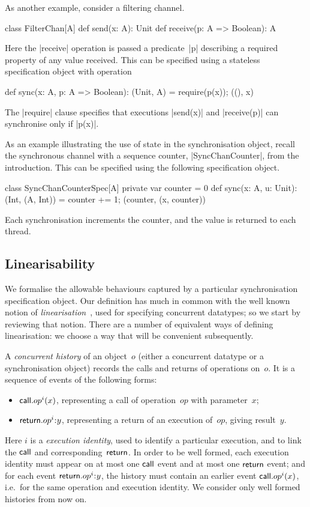 As another example, consider a filtering channel.
\begin{scala}
class FilterChan[A]{
  def send(x: A): Unit
  def receive(p: A => Boolean): A
}
\end{scala}
%
Here the |receive| operation is passed a predicate~|p| describing a required
property of any value received.  This can be specified using a stateless
specification object with operation
%
\begin{scala}
def sync(x: A, p: A => Boolean): (Unit, A) = { require(p(x)); ((), x) }
\end{scala}
%
The |require| clause specifies that executions |send(x)| and |receive(p)| can
synchronise only if |p(x)|.

As an example illustrating the use of state in the synchronisation object,
recall the synchronous channel with a sequence counter, |SyncChanCounter|,
from the introduction.  This can be specified using the following
specification object.
%
\begin{scala}
class SyncChanCounterSpec[A]{
  private var counter = 0
  def sync(x: A, u: Unit): (Int, (A, Int)) = {
    counter += 1; (counter, (x, counter))
  }
}
\end{scala}
%
Each synchronisation increments the counter, and the value is returned to each
thread. 


\subsection{Linearisability}
\label{sec:specification-linearisability}

We formalise the allowable behaviours captured by a particular synchronisation
specification object.  Our definition has much in common with the well known
notion of \emph{linearisation}~\cite{herlihy-wing}, used for specifying
concurrent datatypes; so we start by reviewing that notion.  There are a
number of equivalent ways of defining linearisation: we choose a way that will
be convenient subsequently.

A \emph{concurrent history} of an object~$o$ (either a concurrent datatype or
a synchronisation object) records the calls and returns of operations on~$o$.
It is a sequence of events of the following forms:
%
\begin{itemize}
\item $\mathsf{call}.op^i(x)$, representing a call of operation~$op$ with
  parameter~$x$;
\item $\return.op^i \:: y$, representing a return of an execution of~$op$,
  giving result~$y$.
\end{itemize}
%
Here $i$ is a \emph{execution identity}, used to identify a particular
execution, and to link the $\mathsf{call}$ and corresponding~$\mathsf{return}$.  In order to
be well formed, each execution identity must appear on at most one $\mathsf{call}$
event and at most one $\mathsf{return}$ event; and for each event $\return.op^i\::y$,
the history must contain an earlier event $\mathsf{call}.op^i(x)$, i.e.~for the same
operation and execution identity.  We consider only well formed histories
from now on.  

